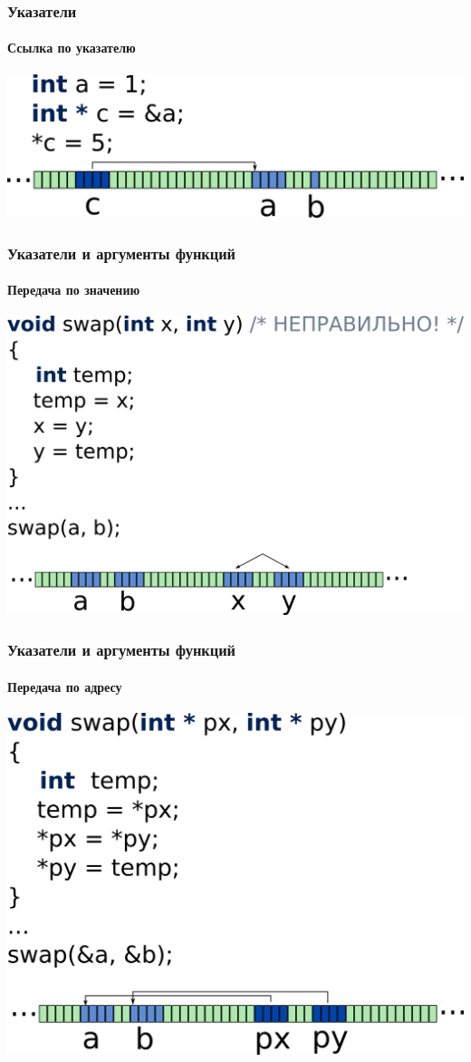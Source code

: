 \documentclass[14pt,pdf,hyperref={unicode}]{beamer}
\begin{document}
\begin{frame}[fragile]
\frametitle{Указатели} 
\framesubtitle{Ссылка по указателю}
\begin{center}
\includegraphics[width=0.95\linewidth]{images/memory_pointer_4.png}
\end{center}
\end{frame}


\begin{frame}[fragile]
\frametitle{Указатели и аргументы функций} 
\framesubtitle{Передача по значению}
\begin{center}
\includegraphics[height=0.55\linewidth]{images/swap_wrong.png}
\end{center}
\end{frame}

\begin{frame}[fragile]
\frametitle{Указатели и аргументы функций} 
\framesubtitle{Передача по адресу}
\begin{center}
\includegraphics[height=0.55\linewidth]{images/swap_right.png}
\end{center}
\end{frame}
\end{document}
